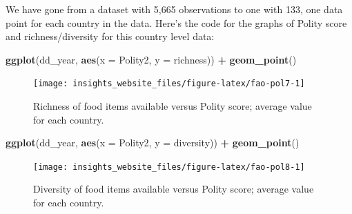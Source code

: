 \documentclass[]{book}
\newenvironment{Shaded}{\begin{snugshade}}{\end{snugshade}}
\newcommand{\DataTypeTok}[1]{\textcolor[rgb]{0.13,0.29,0.53}{#1}}
\newcommand{\KeywordTok}[1]{\textcolor[rgb]{0.13,0.29,0.53}{\textbf{#1}}}
\newcommand{\NormalTok}[1]{#1}
\newcommand{\OperatorTok}[1]{\textcolor[rgb]{0.81,0.36,0.00}{\textbf{#1}}}
\newcommand{\StringTok}[1]{\textcolor[rgb]{0.31,0.60,0.02}{#1}}
\begin{document}
\begin{Shaded}
\end{Shaded}

We have gone from a dataset with 5,665 observations to one with 133, one data point for each country in the data. Here's the code for the graphs of Polity score and richness/diversity for this country level data:

\begin{Shaded}
\begin{Highlighting}[]
\KeywordTok{ggplot}\NormalTok{(dd_year, }\KeywordTok{aes}\NormalTok{(}\DataTypeTok{x =}\NormalTok{ Polity2, }\DataTypeTok{y =}\NormalTok{ richness)) }\OperatorTok{+}
\StringTok{  }\KeywordTok{geom_point}\NormalTok{()}
\end{Highlighting}
\end{Shaded}

\begin{figure}

{\centering \texttt{[image: insights\_website\_files/figure-latex/fao-pol7-1]} 

}

\caption{Richness of food items available versus Polity score; average value for each country.}\label{fig:fao-pol7}
\end{figure}

\begin{Shaded}
\begin{Highlighting}[]
\KeywordTok{ggplot}\NormalTok{(dd_year, }\KeywordTok{aes}\NormalTok{(}\DataTypeTok{x =}\NormalTok{ Polity2, }\DataTypeTok{y =}\NormalTok{ diversity)) }\OperatorTok{+}
\StringTok{  }\KeywordTok{geom_point}\NormalTok{()}
\end{Highlighting}
\end{Shaded}

\begin{figure}

{\centering \texttt{[image: insights\_website\_files/figure-latex/fao-pol8-1]} 

}

\caption{Diversity of food items available versus Polity score; average value for each country.}\label{fig:fao-pol8}
\end{figure}
\end{document}
